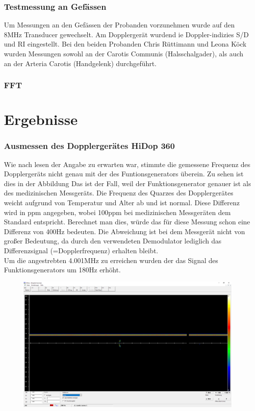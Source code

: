 \documentclass[11pt]{scrartcl}
\begin{document}
    \subsubsection{Testmessung an Gefässen}
    Um Messungen an den Gefässen der Probanden vorzunehmen wurde auf den 8MHz Transducer gewechselt. 
    Am Dopplergerät wurdend ie Doppler-indizies S/D und RI eingestellt. 
    Bei den beiden Probanden Chris Rüttimann und Leona Köck wurden Messungen sowohl an der Carotis Communis (Halsschalgader), als auch an der Arteria Carotis (Handgelenk) durchgeführt.

    \subsubsection{FFT}

    \section{Ergebnisse}
    \subsubsection{Ausmessen des Dopplergerätes HiDop 360}
    Wie nach lesen der Angabe zu erwarten war, stimmte die gemessene Frequenz des Dopplergeräts nicht genau mit der des Funtionsgenerators überein.
    Zu sehen ist dies in der Abbildung %
    Das ist der Fall, weil der Funktionsgenerator genauer ist als des medizinischen Messgeräts.
    Die Frequenz des Quarzes des Dopplergerätes weicht aufgrund von Temperatur und Alter ab und ist normal.
    Diese Differenz wird in ppm angegeben, wobei 100ppm bei medizinischen Messgeräten dem Standard entspricht.
    Berechnet man dies, würde das für diese Messung schon eine Differenz von 400Hz bedeuten. 
    Die Abweichung ist bei dem Messgerät nicht von großer Bedeutung, da durch den verwendeten Demodulator lediglich das Differenzsignal (=Dopplerfrequenz) erhalten bleibt.\\
    Um die angestrebten 4.001MHz zu erreichen wurden der das Signal des Funktionsgenerators um 180Hz erhöht. 

    \begin{figure}[H]
        \includegraphics[width=16cm]{images/4001MHz.png}
    \end{figure}
\end{document}
